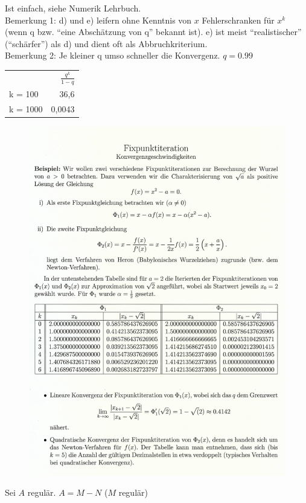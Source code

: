 \beweis Ist einfach, siehe Numerik Lehrbuch.\\
Bemerkung 1: d) und e) leifern ohne Kenntnis von $x$ Fehlerschranken für $x^k$ (wenn q bzw. ``eine Abschätzung von q'' bekannt ist).
e) ist meist ``realistischer'' (``schärfer'') als d) und dient oft als Abbruchkriterium.\\
Bemerkung 2: Je kleiner q umso schneller die Konvergenz. $q = 0.99$\\
\begin{tabular}{l | r}
           & $\frac{q^k}{1-q}$ \\
  k = 100  & 36,6 \\
  k = 1000 & 0,0043
\end{tabular}
\begin{figure}
  \centering
  \includegraphics[width=\textwidth]{figures/fixpunktiteration.png}
\end{figure}
Sei $A$ regulär. $A = M - N$ ($M$ regulär)
